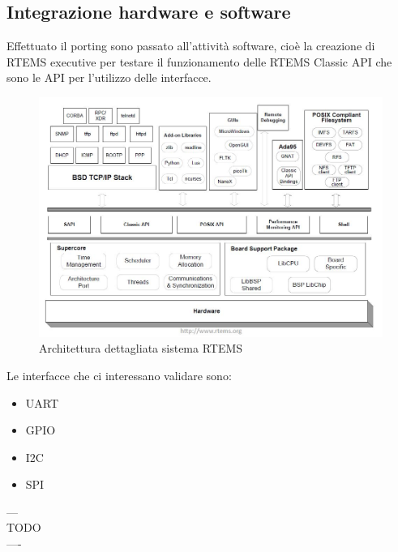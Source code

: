 \documentclass[12pt, a4paper, titlepage, oneside]{book}
\begin{document}
\begin{flushleft}
\chapter{Integrazione hardware e software}

Effettuato il porting sono passato all'attività software, cioè la creazione di RTEMS executive per testare il funzionamento delle RTEMS Classic API che sono le API per l'utilizzo delle interfacce. \\
\begin{figure} [h]
\centering
    \includegraphics[scale = 0.80] {RTEMS_architecture.JPG}
    \caption{Architettura dettagliata sistema RTEMS}
    \label{fig:my_label3}
\end{figure}
Le interfacce che ci interessano validare sono:
\begin{itemize}
    \item UART
    \item GPIO
    \item I2C
    \item SPI
\end{itemize}

---\\
TODO\\
----\\


\end{flushleft}
\end{document}
